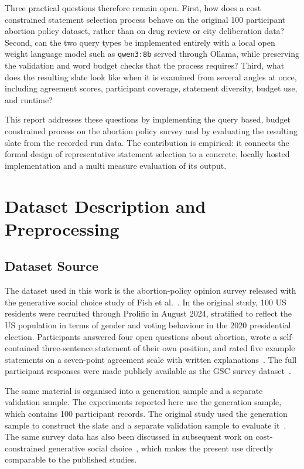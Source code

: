 \documentclass[letterpaper,11pt]{article}
\theoremstyle{plain}
\theoremstyle{definition}
\begin{document}
Three practical questions therefore remain open. First, how does a cost constrained statement selection process behave on the original 100 participant abortion policy dataset, rather than on drug review or city deliberation data? Second, can the two query types be implemented entirely with a local open weight language model such as \texttt{qwen3:8b}\citep{yang2025qwen3} served through Ollama\citep{ollama2026}, while preserving the validation and word budget checks that the process requires? Third, what does the resulting slate look like when it is examined from several angles at once, including agreement scores, participant coverage, statement diversity, budget use, and runtime?

This report addresses these questions by implementing the query based, budget constrained process on the abortion policy survey and by evaluating the resulting slate from the recorded run data. The contribution is empirical: it connects the formal design of representative statement selection to a concrete, locally hosted implementation and a multi measure evaluation of its output.

\section{Dataset Description and Preprocessing}

\subsection{Dataset Source}

The dataset used in this work is the abortion-policy opinion survey released with the generative social choice study of Fish et al.~\citep{fish2026gsc}. In the original study, 100 US residents were recruited through Prolific in August 2024, stratified to reflect the US population in terms of gender and voting behaviour in the 2020 presidential election. Participants answered four open questions about abortion, wrote a self-contained three-sentence statement of their own position, and rated five example statements on a seven-point agreement scale with written explanations~\citep{fish2026gsc}. The full participant responses were made publicly available as the GSC survey dataset~\citep{gsc_survey_data}.

The same material is organised into a generation sample and a separate validation sample. The experiments reported here use the generation sample, which contains 100 participant records. The original study used the generation sample to construct the slate and a separate validation sample to evaluate it~\citep{fish2026gsc}. The same survey data has also been discussed in subsequent work on cost-constrained generative social choice~\citep{boehmer2025nextgen}, which makes the present use directly comparable to the published studies.
\end{document}
